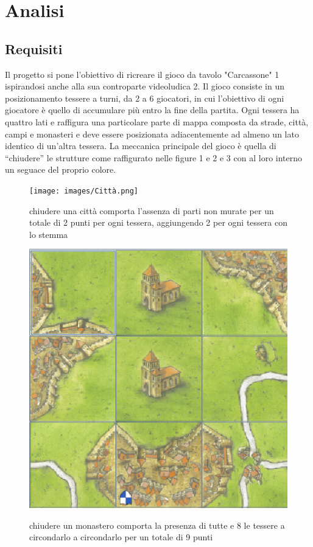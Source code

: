 \section{Analisi}
\subsection{Requisiti}

Il progetto si pone l'obiettivo di ricreare il gioco da tavolo "Carcassone" 1 ispirandosi anche alla sua controparte videoludica 2. Il gioco consiste in un posizionamento tessere a turni, da 2 a 6 giocatori, in cui l’obiettivo di ogni giocatore è quello di accumulare più entro la fine della partita. Ogni tessera ha quattro lati e raffigura una particolare parte di mappa composta da strade, città, campi e monasteri e deve essere posizionata adiacentemente ad almeno un lato identico di un'altra tessera. La meccanica principale del gioco è quella di “chiudere” le strutture come raffigurato nelle figure 1 e 2 e 3 con al loro interno un seguace del proprio colore.

\begin{figure}[]
    {\texttt{[image: images/Città.png]}}

    \caption{chiudere una città comporta l’assenza di parti non murate per un totale di 2 punti per ogni tessera, aggiungendo 2 per ogni tessera con lo stemma}
\end{figure}

\begin{figure}[]
    {\includegraphics[]{images/Monastero.png}}

    \caption{chiudere un monastero comporta la presenza di tutte e 8 le tessere a circondarlo a circondarlo per un totale di 9 punti}
\end{figure}


